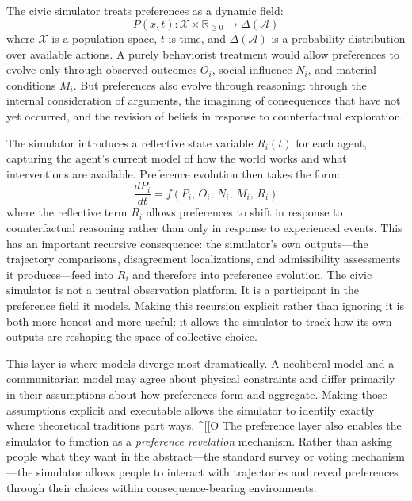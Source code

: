 \documentclass[12pt]{article}
\begin{document}
The civic simulator treats preferences as a dynamic field:
\begin{equation}
  P(x, t) : \mathcal{X} \times \mathbb{R}_{\geq 0} \to \Delta(\mathcal{A})
\end{equation}
where $\mathcal{X}$ is a population space, $t$ is time, and $\Delta(\mathcal{A})$ is a probability distribution over available actions. A purely behaviorist treatment would allow preferences to evolve only through observed outcomes $O_i$, social influence $N_i$, and material conditions $M_i$. But preferences also evolve through reasoning: through the internal consideration of arguments, the imagining of consequences that have not yet occurred, and the revision of beliefs in response to counterfactual exploration.

The simulator introduces a reflective state variable $R_i(t)$ for each agent, capturing the agent's current model of how the world works and what interventions are available. Preference evolution then takes the form:
\begin{equation}
  \frac{dP_i}{dt} = f(P_i,\, O_i,\, N_i,\, M_i,\, R_i)
\end{equation}
where the reflective term $R_i$ allows preferences to shift in response to counterfactual reasoning rather than only in response to experienced events. This has an important recursive consequence: the simulator's own outputs---the trajectory comparisons, disagreement localizations, and admissibility assessments it produces---feed into $R_i$ and therefore into preference evolution. The civic simulator is not a neutral observation platform. It is a participant in the preference field it models. Making this recursion explicit rather than ignoring it is both more honest and more useful: it allows the simulator to track how its own outputs are reshaping the space of collective choice.

This layer is where models diverge most dramatically. A neoliberal model and a communitarian model may agree about physical constraints and differ primarily in their assumptions about how preferences form and aggregate. Making those assumptions explicit and executable allows the simulator to identify exactly where theoretical traditions part ways.
^[[O
The preference layer also enables the simulator to function as a \emph{preference revelation} mechanism. Rather than asking people what they want in the abstract---the standard survey or voting mechanism---the simulator allows people to interact with trajectories and reveal preferences through their choices within consequence-bearing environments.
\end{document}
